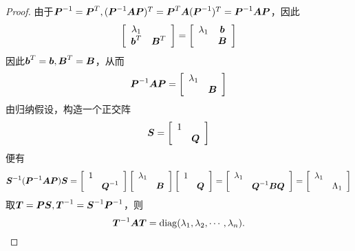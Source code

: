 \begin{frame}
\begin{proof}
  由于$\boldsymbol{P}^{-1}=\boldsymbol{P}^T, (\boldsymbol{P}^{-1}\boldsymbol{A}\boldsymbol{P})^T=\boldsymbol{P}^T\boldsymbol{A}(\boldsymbol{P}^{-1})^T=\boldsymbol{P}^{-1}\boldsymbol{A}\boldsymbol{P}$，因此
  $$
  \left[
    \begin{array}{cc}
      \lambda_1&\\
      {\boldsymbol{b}}^T&\boldsymbol{B}^T
    \end{array}
  \right]=
  \left[
    \begin{array}{cc}
      \lambda_1&{\boldsymbol{b}}\\
               &\boldsymbol{B}
    \end{array}
  \right]
  $$
  \pause 
  因此${\boldsymbol{b}}^T={\boldsymbol{b}}, \boldsymbol{B}^T=\boldsymbol{B}$，从而
  $$
  \boldsymbol{P}^{-1}\boldsymbol{A}\boldsymbol{P}=\left[
    \begin{array}{cc}
      \lambda_1& \\
               &\boldsymbol{B}
    \end{array}
  \right]
  $$
  由归纳假设，构造一个正交阵
  $$
  \boldsymbol{S}=\left[
    \begin{array}{cc}
      1&\\
       &\boldsymbol{Q}
    \end{array}
  \right]
  $$
  便有
  $$
  \boldsymbol{S}^{-1}(\boldsymbol{P}^{-1}\boldsymbol{A}\boldsymbol{P})\boldsymbol{S}=
  \left[
    \begin{array}{cc}
      1&\\
       &\boldsymbol{Q}^{-1}
    \end{array}
  \right]
  \left[
    \begin{array}{cc}
      \lambda_1& \\
               &\boldsymbol{B}
    \end{array}
  \right]
  \left[
    \begin{array}{cc}
      1&\\
       &\boldsymbol{Q}
    \end{array}
  \right]=
  \left[
    \begin{array}{cc}
      \lambda_1& \\
               &\boldsymbol{Q}^{-1}\boldsymbol{B}\boldsymbol{Q}
    \end{array}
  \right]=\left[
    \begin{array}{cc}
      \lambda_1& \\
               &\Lambda_1
    \end{array}
  \right]
  $$
  \pause 
  取$\boldsymbol{T}=\boldsymbol{P}\boldsymbol{S}, \boldsymbol{T}^{-1}=\boldsymbol{S}^{-1}\boldsymbol{P}^{-1}$，则
  $$
  \boldsymbol{T}^{-1}\boldsymbol{A}\boldsymbol{T}=\mathrm{diag}(\lambda_1,\lambda_2,\cdots,\lambda_n).
  $$
\end{proof}
\end{frame}

